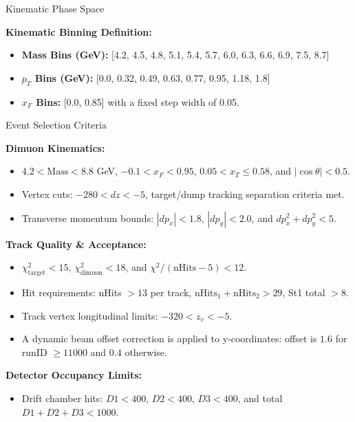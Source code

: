 \documentclass[aspectratio=169]{beamer}
\begin{document}
\begin{frame}{Kinematic Phase Space}
    
\textbf{Kinematic Binning Definition:}
\begin{itemize}
    \item \textbf{Mass Bins (GeV):} [4.2, 4.5, 4.8, 5.1, 5.4, 5.7, 6.0, 6.3, 6.6, 6.9, 7.5, 8.7]
    \item \textbf{$p_T$ Bins (GeV):} [0.0, 0.32, 0.49, 0.63, 0.77, 0.95, 1.18, 1.8]
    \item \textbf{$x_F$ Bins:} [0.0, 0.85] with a fixed step width of 0.05.
\end{itemize}

\end{frame}

\begin{frame}{Event Selection Criteria}
    \footnotesize
    
\textbf{Dimuon Kinematics:}
\begin{itemize}
    \item $4.2 < \text{Mass} < 8.8$ GeV, $-0.1 < x_F < 0.95$, $0.05 < x_T \le 0.58$, and $|\cos\theta| < 0.5$.
    \item Vertex cuts: $-280 < dz < -5$, target/dump tracking separation criteria met.
    \item Transverse momentum bounds: $|dp_x| < 1.8$, $|dp_y| < 2.0$, and $dp_x^2 + dp_y^2 < 5$.
\end{itemize}
\vspace{0.2cm}
\textbf{Track Quality \& Acceptance:}
\begin{itemize}
    \item $\chi^2_{\text{target}} < 15$, $\chi^2_{\text{dimuon}} < 18$, and $\chi^2/(\text{nHits}-5) < 12$.
    \item Hit requirements: nHits $> 13$ per track, $\text{nHits}_1+\text{nHits}_2 > 29$, St1 total $> 8$.
    \item Track vertex longitudinal limits: $-320 < z_v < -5$.
    \item A dynamic beam offset correction is applied to y-coordinates: offset is $1.6$ for runID $\ge 11000$ and $0.4$ otherwise.
\end{itemize}
\vspace{0.2cm}
\textbf{Detector Occupancy Limits:}
\begin{itemize}
    \item Drift chamber hits: $D1 < 400$, $D2 < 400$, $D3 < 400$, and total $D1+D2+D3 < 1000$.
\end{itemize}

\end{frame}
\end{document}

